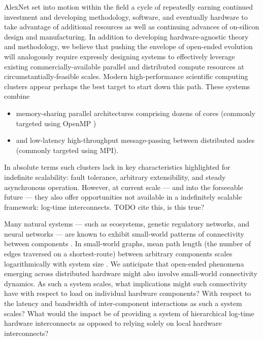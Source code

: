 AlexNet set into motion within the field a cycle of repeatedly earning continued investment and developing methodology, software, and eventually hardware to take advantage of additional resources as well as continuing advances of on-silicon design and manufacturing.
In addition to developing hardware-agnostic theory and methodology, we believe that pushing the envelope of open-ended evolution will analogously require expressly designing systems to effectively leverage existing commercially-available parallel and distributed compute resources at circumstantially-feasible scales.
Modern high-performance scientific computing clusters appear perhaps the best target to start down this path.
These systems combine
\begin{itemize}
\item memory-sharing parallel architectures comprising dozens of cores (commonly targeted using OpenMP \citep{dagum1998openmp})
\item and low-latency high-throughput message-passing between distributed nodes (commonly targeted using MPI\citep{clarke1994mpi}).
\end{itemize}

In absolute terms such clusters lack in key characteristics highlighted for indefinite scalability: fault tolerance, arbitrary extensibility, and steady asynchronous operation.
However, at current scale --- and into the forseeable future --- they also offer opportunities not available in a indefinitely scalable framework: log-time interconnects.
TODO cite this, is this true?

Many natural systems --- such as ecosystems, genetic regulatory networks, and neural networks --- are known to exhibit small-world patterns of connectivity between components \citep{bassett2017small, fox2014herbivores, gaiteri2014beyond}.
In small-world graphs, mean path length (the number of edges traversed on a shortest-route) between arbitrary components scales logarithmically with system size \citep{watts1998collective}.
We anticipate that open-ended phenomena emerging across distributed hardware might also involve small-world connectivity dynamics.
As such a system scales, what implications might such connectivity have with respect to load on individual hardware components?
With respect to the latency and bandwidth of inter-component interactions as such a system scales?
What would the impact be of providing a system of hierarchical log-time hardware interconnects as opposed to relying solely on local hardware interconnects?

